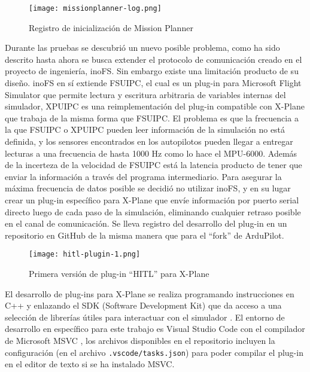 \begin{figure}[h]
    \centering
    \texttt{[image: missionplanner-log.png]}
    \caption{Registro de inicialización de Mission Planner}
    \label{fig:missionplanner-log}
\end{figure}

Durante las pruebas se descubrió un nuevo posible problema, como ha sido descrito hasta ahora se busca extender el protocolo de comunicación creado en el proyecto de ingeniería, inoFS. Sin embargo existe una limitación producto de su diseño. inoFS en sí extiende FSUIPC, el cual es un plug-in para Microsoft Flight Simulator que permite lectura y escritura arbitraria de variables internas del simulador, XPUIPC es una reimplementación del plug-in compatible con X-Plane que trabaja de la misma forma que FSUIPC. El problema es que la frecuencia a la que FSUIPC o XPUIPC pueden leer información de la simulación no está definida, y los sensores encontrados en los autopilotos pueden llegar a entregar lecturas a una frecuencia de hasta 1000 Hz como lo hace el MPU-6000. Además de la incerteza de la velocidad de FSUIPC está la latencia producto de tener que enviar la información a través del programa intermediario. Para asegurar la máxima frecuencia de datos posible se decidió no utilizar inoFS, y en su lugar crear un plug-in específico para X-Plane que envíe información por puerto serial directo luego de cada paso de la simulación, eliminando cualquier retraso posible en el canal de comunicación. Se lleva registro del desarrollo del plug-in en un repositorio en GitHub \cite{xplane-hitl-plugin} de la misma manera que para el ``fork'' de ArduPilot.

\begin{figure}[h]
    \centering
    \texttt{[image: hitl-plugin-1.png]}
    \caption{Primera versión de plug-in ``HITL'' para X-Plane}
    \label{fig:hitl-plugin-1}
\end{figure}

El desarrollo de plug-ins para X-Plane se realiza programando instrucciones en C++ y enlazando el SDK (Software Development Kit) que da acceso a una selección de librerías útiles para interactuar con el simulador \cite{xplane-plugin-dev}. El entorno de desarrollo en específico para este trabajo es Visual Studio Code con el compilador de Microsoft MSVC \cite{vscode-cpp}, los archivos disponibles en el repositorio incluyen la configuración (en el archivo \texttt{.vscode/tasks.json}) para poder compilar el plug-in en el editor de texto si se ha instalado MSVC.

